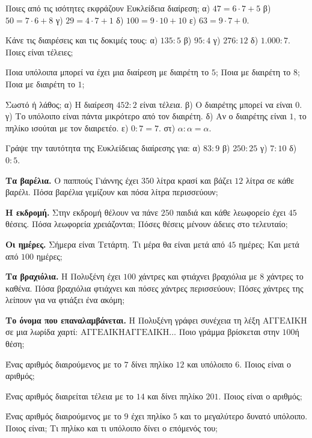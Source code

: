 \ex Ποιες από τις ισότητες εκφράζουν Ευκλείδεια διαίρεση; α) $47=6\cdot 7+5$ \quad β) $50=7\cdot 6+8$ \quad γ) $29=4\cdot 7+1$ \quad δ) $100=9\cdot 10+10$ \quad ε) $63=9\cdot 7+0$.

\ex Κάνε τις διαιρέσεις και τις δοκιμές τους: α) $135:5$ \quad β) $95:4$ \quad γ) $276:12$ \quad δ) $1.000:7$. Ποιες είναι τέλειες;

\ex Ποια υπόλοιπα μπορεί να έχει μια διαίρεση με διαιρέτη το $5$; Ποια με διαιρέτη το $8$; Ποια με διαιρέτη το $1$;

\ex Σωστό ή λάθος; α) Η διαίρεση $452:2$ είναι τέλεια. \quad β) Ο διαιρέτης μπορεί να είναι $0$. \quad γ) Το υπόλοιπο είναι πάντα μικρότερο από τον διαιρέτη. \quad δ) Αν ο διαιρέτης είναι $1$, το πηλίκο ισούται με τον διαιρετέο. \quad ε) $0:7=7$. \quad στ) $\alpha:\alpha=\alpha$.

\ex Γράψε την ταυτότητα της Ευκλείδειας διαίρεσης για: α) $83:9$ \quad β) $250:25$ \quad γ) $7:10$ \quad δ) $0:5$.


\ex \textbf{Τα βαρέλια.} Ο παππούς Γιάννης έχει $350$ λίτρα κρασί και βάζει $12$ λίτρα σε κάθε βαρέλι. Πόσα βαρέλια γεμίζουν και πόσα λίτρα περισσεύουν;

\ex \textbf{Η εκδρομή.} Στην εκδρομή θέλουν να πάνε $250$ παιδιά και κάθε λεωφορείο έχει $45$ θέσεις. Πόσα λεωφορεία χρειάζονται; Πόσες θέσεις μένουν άδειες στο τελευταίο;

\ex \textbf{Οι ημέρες.} Σήμερα είναι Τετάρτη. Τι μέρα θα είναι μετά από $45$ ημέρες; Και μετά από $100$ ημέρες;

\ex \textbf{Τα βραχιόλια.} Η Πολυξένη έχει $100$ χάντρες και φτιάχνει βραχιόλια με $8$ χάντρες το καθένα. Πόσα βραχιόλια φτιάχνει και πόσες χάντρες περισσεύουν; Πόσες χάντρες της λείπουν για να φτιάξει ένα ακόμη;

\ex \textbf{Το όνομα που επαναλαμβάνεται.} Η Πολυξένη γράφει συνέχεια τη λέξη $\mathrm{ΑΓΓΕΛΙΚΗ}$ σε μια λωρίδα χαρτί: $\mathrm{ΑΓΓΕΛΙΚΗΑΓΓΕΛΙΚΗ}\dots$ Ποιο γράμμα βρίσκεται στην $100$ή θέση;


\ex Ένας αριθμός διαιρούμενος με το $7$ δίνει πηλίκο $12$ και υπόλοιπο $6$. Ποιος είναι ο αριθμός;

\ex Ένας αριθμός διαιρείται τέλεια με το $14$ και δίνει πηλίκο $201$. Ποιος είναι ο αριθμός;

\ex Ένας αριθμός διαιρούμενος με το $9$ έχει πηλίκο $5$ και το μεγαλύτερο δυνατό υπόλοιπο. Ποιος είναι; Τι πηλίκο και τι υπόλοιπο δίνει ο επόμενός του;

